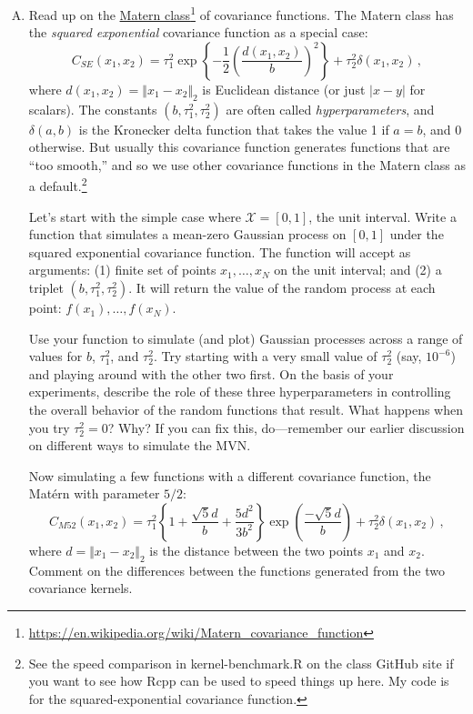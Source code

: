 \documentclass[11pt]{article}
\begin{document}
\begin{enumerate}[(A)]
\item   Read up on the \href{https://en.wikipedia.org/wiki/Mat�rn_covariance_function}{Matern class}\footnote{\url{https://en.wikipedia.org/wiki/Matern_covariance_function}} of covariance functions.  The Matern class has the \textit{squared exponential} covariance function as a special case:
$$
C_{SE}(x_1, x_2) = \tau_1^2 \exp \left\{ - \frac{1}{2} \left( \frac{d(x_1, x_2)}{b} \right)^2 \right\} + \tau^2_2 \delta(x_1, x_2) \, ,
$$
where $d(x_1, x_2) = \Vert x_1 - x_2 \Vert_2$ is Euclidean distance (or just $|x-y|$ for scalars).  The constants $(b, \tau^2_1, \tau^2_2)$ are often called \textit{hyperparameters}, and $\delta(a,b)$ is the Kronecker delta function that takes the value 1 if $a=b$, and 0 otherwise.  But usually this covariance function generates functions that are ``too smooth,'' and so we use other covariance functions in the Matern class as a default.\footnote{See the speed comparison in kernel-benchmark.R on the class GitHub site if you want to see how Rcpp can be used to speed things up here.  My code is for the squared-exponential covariance function.}

Let's start with the simple case where $\mathcal{X} = [0,1]$, the unit interval.  Write a function that simulates a mean-zero Gaussian process on $[0,1]$ under the squared exponential covariance function.  The function will accept as arguments: (1) finite set of points $x_1, \ldots, x_N$ on the unit interval; and (2) a triplet $(b, \tau^2_1, \tau^2_2)$. It will return the value of the random process at each point: $f(x_1), \ldots, f(x_N)$.

Use your function to simulate (and plot) Gaussian processes across a range of values for $b$, $\tau^2_1$, and $\tau^2_2$.  Try starting with a very small value of $\tau^2_2$ (say, $10^{-6}$) and playing around with the other two first.  On the basis of your experiments, describe the role of these three hyperparameters in controlling the overall behavior of the random functions that result.  What happens when you try $\tau^2_2 = 0$? Why?  If you can fix this, do---remember our earlier discussion on different ways to simulate the MVN.

Now simulating a few functions with a different covariance function, the Mat\'ern with parameter $5/2$:
$$
C_{M52}(x_1, x_2) = \tau_1^2 \left\{ 1 + \frac{\sqrt{5}d}{b} + \frac{5d^2}{3b^2} \right\} \exp\left( \frac{-\sqrt{5}d}{b} \right) + \tau^2_2 \delta(x_1, x_2) \, ,
$$
where $d = \Vert x_1 - x_2 \Vert_2$ is the distance between the two points $x_1$ and $x_2$.  Comment on the differences between the functions generated from the two covariance kernels.


\end{enumerate}
\end{document}
